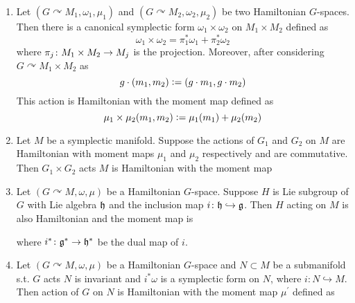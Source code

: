 \documentclass[a4paper,12pt]{article}
\begin{document}
	\begin{exam}[Operations]
		\begin{enumerate}
			\item Let $(G \curvearrowright M_1,\omega_1,\mu_1)$ and $(G \curvearrowright M_2,\omega_2,\mu_2)$ be two Hamiltonian $G$-spaces. Then there is a canonical symplectic form $\omega_1 \times \omega_2$ on $M_1 \times M_2$ defined as
			\begin{equation*}
				\omega_1 \times \omega_2  = \pi_1^*\omega_1+\pi_2^*\omega_2
			\end{equation*}
			where $\pi_j \colon M_1 \times M_2 \rightarrow M_j$ is the projection. Moreover, after considering $G\curvearrowright M_1 \times M_2$ as
			\begin{equation*}
				g \cdot (m_1,m_2) \vcentcolon= (g \cdot m_1,g \cdot m_2)
			\end{equation*}
			This action is Hamiltonian with the moment map defined as
			\begin{equation*}
				\mu_1 \times  \mu_2 (m_1,m_2) \vcentcolon= \mu_1(m_1) +  \mu_2(m_2)
			\end{equation*}

			\item Let $M$ be a symplectic manifold. Suppose the actions of $G_1$ and $G_2$ on $M$ are Hamiltonian with moment maps $\mu_1$ and $\mu_2$ respectively and are commutative. Then $G_1 \times G_2$ acts $M$ is Hamiltonian with the moment map
			\begin{center}
			\end{center}

			\item Let $(G \curvearrowright M,\omega,\mu)$ be a Hamiltonian $G$-space. Suppose $H$ is Lie subgroup of $G$ with Lie algebra $\mathfrak{h}$ and the inclusion map $i \colon \mathfrak{h} \hookrightarrow \mathfrak{g}$. Then $H$ acting on $M$ is also Hamiltonian and the moment map is
			\begin{center}
			\end{center}
			where $i^* \colon \mathfrak{g}^* \rightarrow \mathfrak{h}^*$ be the dual map of $i$.

			\item Let $(G \curvearrowright M,\omega,\mu)$ be a Hamiltonian $G$-space and $N \subset M$ be a submanifold s.t. $G$  acts $N$ is invariant and $i^*\omega$ is a symplectic form on $N$, where $i \colon N \hookrightarrow M$. Then action of $G$ on $N$ is Hamiltonian with the moment map $\mu^{\prime}$ defined as
			\begin{center}
			\end{center}
		\end{enumerate}
	\end{exam}
\end{document}
